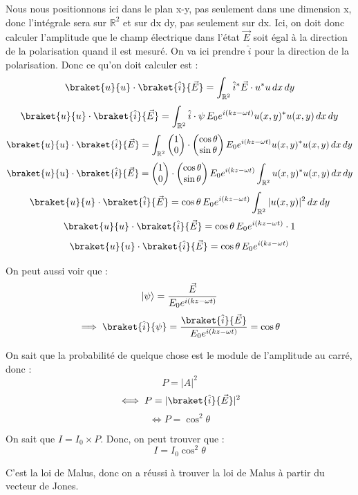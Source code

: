 \documentclass{article}
\begin{document}
Nous nous positionnons ici dans le plan x-y, pas seulement dans une dimension x, donc l'intégrale sera sur $ \mathbb{R}^2 $ et sur dx dy, pas seulement sur dx. Ici, on doit donc calculer l'amplitude que le champ électrique dans l'état $ \vec{E} $ soit égal à la direction de la polarisation quand il est mesuré. On va ici prendre $ \hat{i} $ pour la direction de la polarisation. Donc ce qu'on doit calculer est :
\[
\braket{u}{u} \cdot \braket{\hat{i}}{\vec{E}} = \int_{\mathbb{R}^2} \hat{i}^{*} \vec{E} \cdot u^{*} u \, dx \, dy
\]
\[
\braket{u}{u} \cdot \braket{\hat{i}}{\vec{E}} = \int_{\mathbb{R}^2} \hat{i} \cdot \psi \, E_0 e^{i(kz -\omega t)} u(x,y)^{*} u(x, y) \, dx \, dy
\]
\[
\braket{u}{u} \cdot \braket{\hat{i}}{\vec{E}} = \int_{\mathbb{R}^2} 
\begin{pmatrix} 1 \\ 0 \end{pmatrix} \cdot \begin{pmatrix} \cos \theta \\ \sin \theta \end{pmatrix} 
E_0 e^{i(kz -\omega t)} u(x,y)^{*} u(x, y) \, dx \, dy
\]
\[
\braket{u}{u} \cdot \braket{\hat{i}}{\vec{E}} = 
\begin{pmatrix} 1 \\ 0 \end{pmatrix} \cdot \begin{pmatrix} \cos \theta \\ \sin \theta \end{pmatrix} 
E_0 e^{i(kz -\omega t)} \int_{\mathbb{R}^2} u(x,y)^{*} u(x, y) \, dx \, dy
\]
\[
\braket{u}{u} \cdot \braket{\hat{i}}{\vec{E}} = \cos \theta \, E_0 e^{i(kz -\omega t)} \int_{\mathbb{R}^2} |u(x,y)|^2 \, dx \, dy
\]
\[
\braket{u}{u} \cdot \braket{\hat{i}}{\vec{E}} = \cos \theta \, E_0 e^{i(kz -\omega t)} \cdot 1
\]
\[
\braket{u}{u} \cdot \braket{\hat{i}}{\vec{E}} = \cos \theta \, E_0 e^{i(kz -\omega t)}
\]

On peut aussi voir que :
\[
\lvert\psi\rangle = \frac{\vec{E}}{E_0 e^{i(kz - \omega t)}}
\]
\[
\implies \braket{\hat{i}}{\psi} = \frac{\braket{\hat{i}}{\vec{E}}}{E_0 e^{i(kz - \omega t)}} = \cos \theta
\]

On sait que la probabilité de quelque chose est le module de l'amplitude au carré, donc :
\[
P = |A|^2
\]
\[
\iff P = |\braket{\hat{i}}{\vec{E}}|^2
\]
\[
\iff P = \cos^2 \theta
\]

On sait que $ I = I_0 \times P $.  
Donc, on peut trouver que :
\[
I = I_0 \cos^2 \theta
\]

C'est la loi de Malus, donc on a réussi à trouver la loi de Malus à partir du vecteur de Jones.
\end{document}
